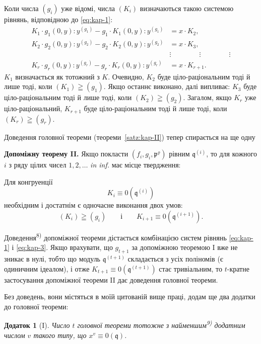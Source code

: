 \documentclass[11pt]{article}
\theoremstyle{plain}
\newtheorem{zusatz}{Додаток}
\begin{document}
Коли числа $(g_{i})$ уже відомі, числа $(K_{i})$ визначаються такою
системою рівнянь, відповідною до \eqref{eq:kap-1}:
\begin{equation}\label{eq:kap-3}
\begin{aligned}
K_{1} \cdot g_{1}(0,y):y^{(g_{1})} - g_{1} \cdot K_{1}(0,y):y^{(g_{1})} &= x \cdot K_{2},\\
K_{2} \cdot g_{2}(0,y):y^{(g_{2})} - g_{2} \cdot K_{2}(0,y):y^{(g_{2})} &= x \cdot K_{3},\\
&\vdots \qquad\qquad\vdots\qquad\qquad\vdots\\
K_{r} \cdot g_{r}(0,y):y^{(g_{r})} - g_{r} \cdot K_{r}(0,y):y^{(g_{r})} &= x \cdot K_{r+1}.
\end{aligned}
\end{equation}
$K_{1}$ визначається як тотожний з $K$. Очевидно, $K_{2}$ буде
ціло-раціональним тоді й лише тоді, коли $(K_1)\geqq(g_1)$.
Якщо останнє виконано, далі випливає: $K_{3}$ буде
ціло-раціональним тоді й лише тоді, коли $(K_2)\geqq(g_2)$.
Загалом, якщо $K_{r}$ уже ціло-раціональний, $K_{r+1}$ буде
ціло-раціональним тоді й лише тоді, коли $(K_r)\geqq(g_r)$.

Доведення головної теореми (теореми~\ref{satz:kap-II}) тепер
спирається на ще одну

\smallskip
\textbf{Допоміжну теорему II.} Якщо покласти
$(f_i,g_i,\mathfrak{p}^\varrho)$ рівним $\mathfrak{q}^{(i)}$, то для
кожного $i$ з ряду цілих чисел $1, 2, \ldots$ \textit{in inf.} має
місце твердження:

Для конгруенції
\[
K_{i} \equiv 0(\mathfrak{q}^{(i)})
\]
необхідним і достатнім є одночасне виконання двох умов:
\[
(K_{i}) \geqq (g_{i}) \qquad \text{і} \qquad
K_{i+1} \equiv 0(\mathfrak{q}^{(i+1)}).
\]

Доведення\textsuperscript{8)} допоміжної теореми дістається
комбінацією систем рівнянь \eqref{eq:kap-1} і \eqref{eq:kap-3}. Якщо
врахувати, що $g_{t+1}$ за допоміжною теоремою I вже не зникає в
нулі, тобто що модуль $\mathfrak{q}^{(t+1)}$ складається з усіх
поліномів (є одиничним ідеалом), і отже
$K_{t+1} \equiv 0(\mathfrak{q}^{(t+1)})$ стає тривіальним, то
$t$-кратне застосування допоміжної теореми II дає доведення
головної теореми.

\smallskip
Без доведень, вони містяться в моїй цитованій вище праці, додам ще
два додатки до головної теореми:

\begin{zusatz}[I]
Число $t$ головної теореми тотожне з найменшим\textsuperscript{9)}
додатним числом $v$ такого типу, що $x^{v} \equiv 0(\mathfrak{q})$.
\end{zusatz}
\end{document}
